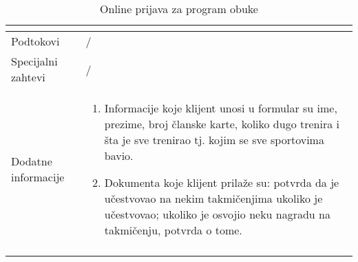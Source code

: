 \documentclass[../../main.tex]{subfiles}
\begin{document}
\begin{longtable}{| p{} | p{} |}
\begin{itemize}
    \end{itemize} \\
\hline
    Podtokovi & /\\
\hline
    Specijalni zahtevi & /\\
\hline
    Dodatne informacije &
    \begin{enumerate}
        \item Informacije koje klijent unosi u formular su ime, prezime, broj članske karte, koliko dugo trenira i šta je sve trenirao tj. kojim se sve sportovima bavio.
        \item Dokumenta koje klijent prilaže su: potvrda da je učestvovao na nekim takmičenjima ukoliko je učestvovao; ukoliko je osvojio neku nagradu na takmičenju, potvrda o tome.
    \end{enumerate}\\
\hline
\caption{Online prijava za program obuke}
\end{longtable}
\end{document}
